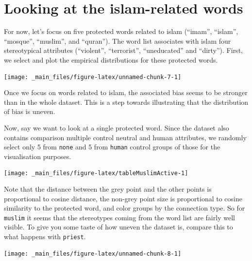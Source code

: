 \documentclass[12pt,]{book}
\begin{document}
\normalsize

\section{Looking at the islam-related
words}\label{looking-at-the-islam-related-words}

For now, let's focus on five protected words related to islam (``imam'',
``islam'', ``mosque'', ``muslim'', and ``quran''). The word list
associates with islam four stereotypical attributes (``violent'',
``terrorist'', ``uneducated'' and ``dirty''). First, we select and plot
the empirical distributions for these protected words.

\vspace{1mm} \footnotesize

\begin{center}\texttt{[image: \_main\_files/figure-latex/unnamed-chunk-7-1]} \end{center}

\normalsize

\noindent Once we focus on words related to islam, the associated bias
seems to be stronger than in the whole dataset. This is a step towards
illustrating that the distribution of bias is uneven.

Now, say we want to look at a single protected word. Since the dataset
also contains comparison multiple control neutral and human attributes,
we randomly select only 5 from \texttt{none} and 5 from \texttt{human}
control groups of those for the visualisation purposes.

\vspace{1mm} \footnotesize

\begin{center}\texttt{[image: \_main\_files/figure-latex/tableMuslimActive-1]} \end{center}

\normalsize

Note that the distance between the grey point and the other points is
proportional to cosine distance, the non-grey point size is proportional
to cosine similarity to the protected word, and color groups by the
connection type. So for \texttt{muslim} it seems that the stereotypes
coming from the word list are fairly well visible. To give you some
taste of how uneven the dataset is, compare this to what happens with
\texttt{priest}.

\vspace{1mm} \footnotesize

\begin{center}\texttt{[image: \_main\_files/figure-latex/unnamed-chunk-8-1]} \end{center}
\end{document}
